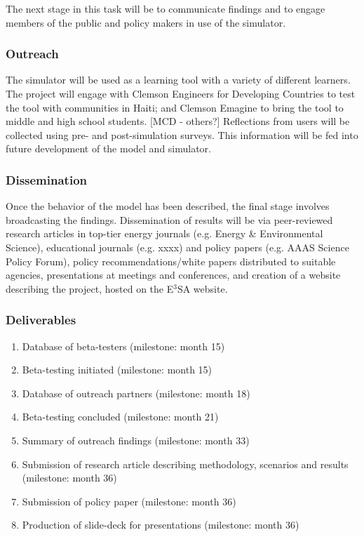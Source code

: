 \documentclass[11pt,a4paper]{article}
\begin{document}
The next stage in this task will be 
to communicate findings and
to engage members of the public and policy makers in use of the simulator. 

\subsubsection{Outreach}

The simulator will be used as a learning tool with a variety of different learners.
The project will engage with 
Clemson Engineers for Developing Countries to test the tool with communities in Haiti; and
Clemson Emagine to bring the tool to middle and high school students.
[MCD - others?]
Reflections from users will be collected using pre- and post-simulation surveys.
This information will be fed into future development of the model and simulator.

\subsubsection{Dissemination}

Once the behavior of the model has been described, 
the final stage involves broadcasting the findings. 
Dissemination of results will be via 
peer-reviewed research articles in top-tier energy journals 
(e.g. Energy \& Environmental Science),
educational journals (e.g. xxxx) and 
policy papers (e.g. AAAS Science Policy Forum), 
policy recommendations/white papers distributed to suitable agencies, 
presentations at meetings and conferences, and 
creation of a website describing the project, hosted on the E$^3$SA website.

\subsubsection{Deliverables}
\begin{enumerate}
\vspace{-9pt}
\setlength{\itemsep}{-3pt}
\setcounter{enumi}{13}
	\item	Database of beta-testers (milestone: month 15)
	\item	Beta-testing initiated (milestone: month 15)
	\item	Database of outreach partners (milestone: month 18)
	\item	Beta-testing concluded (milestone: month 21)
	\item	Summary of outreach findings (milestone: month 33)
	\item 	Submission of research article describing 
				methodology, scenarios and results (milestone: month 36)
	\item 	Submission of policy paper (milestone: month 36)
	\item 	Production of slide-deck for presentations (milestone: month 36)
\end{enumerate}
\end{document}
